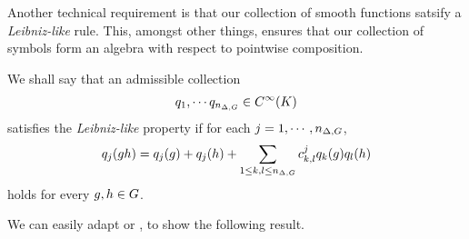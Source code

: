 Another technical requirement is that our collection of smooth functions satsify a \emph{Leibniz-like} rule.
This, amongst other things, ensures that our collection of symbols form an algebra with respect to pointwise composition.

\begin{definition}
\label{definition:Leibniz-like_property_for_smooth_functions}
    We shall say that an admissible collection
    \begin{align*}
        q_1, \cdots q_{n_{\Delta, G}} \in {C^\infty(K)}
    \end{align*}
    satisfies the \emph{Leibniz-like} property
    if for each $j = 1, \cdots, n_{\Delta, G}$,
    \begin{align*}
        q_j(g h) = q_j(g) + q_j(h) + \sum_{1 \leq k, l \leq n_{\Delta, G}} c^j_{k, l} q_k(g) q_l(h)
    \end{align*}
    holds for every $g, h \in G$.
\end{definition}

We can easily adapt \cite[Lemma 4.4]{RuzhanskyTurunenWirth10} or \cite[Corollay 5.13]{Fischer2015},
to show the following result.

